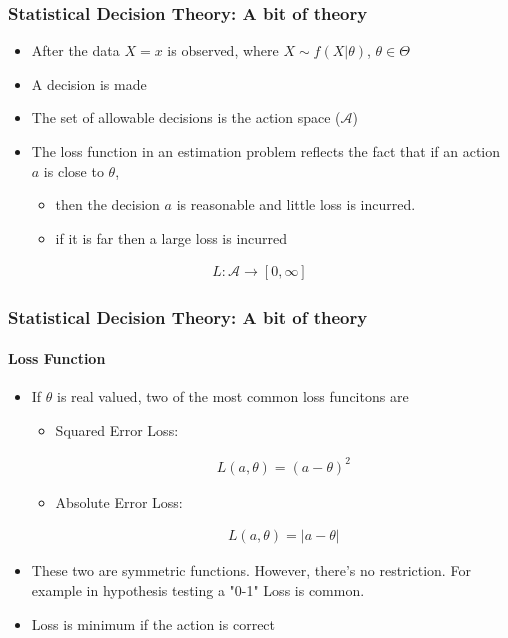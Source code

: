 \documentclass[
  shownotes,
  xcolor={svgnames},
  hyperref={colorlinks,citecolor=DarkBlue,linkcolor=DarkRed,urlcolor=DarkBlue}
  ]{beamer}
\begin{document}
\begin{frame}
\frametitle{Statistical Decision Theory: A bit of theory}


\begin{itemize}
  \item After the data $X=x$ is observed, where $X\sim f(X|\theta)$, $\theta \in \Theta$
  \item A decision is made
  \item The set of allowable decisions is the action space ($\mathcal{A}$)
  \item The loss function in an estimation problem reflects the fact that if an action $a$ is close to $\theta$,
  \begin{itemize}
   \item then the decision $a$ is reasonable and little loss is incurred.
   \item if it is far then a large loss is incurred
  \end{itemize}
\end{itemize}

\begin{align}
    L:\mathcal{A}\rightarrow\left[0,\infty\right]
\end{align}


\end{frame}

\begin{frame}
\frametitle{Statistical Decision Theory: A bit of theory}
\framesubtitle{Loss Function}

\begin{itemize}
\item If $\theta$ is real valued, two of the most common loss funcitons are

\begin{itemize}
  \item Squared Error Loss:
  
  \begin{align}
      L(a,\theta)=(a-\theta)^{2}
  \end{align}
    
    \item Absolute Error Loss:

    \begin{align}
      L(a,\theta)=|a-\theta|
    \end{align}
\end{itemize}


\item These two are symmetric functions. However, there's no restriction. For example in hypothesis testing a "0-1" Loss is common.
\item Loss is minimum if the action is correct
\end{itemize}
\end{frame}
\end{document}
